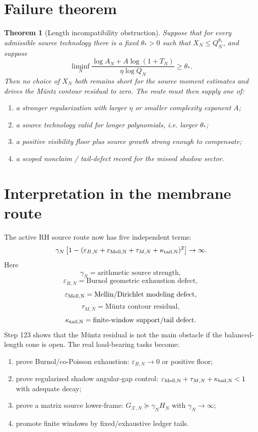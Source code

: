 \documentclass[11pt]{article}
\newtheorem{theorem}{Theorem}
\newcommand{\eps}{\varepsilon}
\newcommand{\cX}{\mathcal X}
\begin{document}
\section{Failure theorem}
\begin{theorem}[Length incompatibility obstruction]
Suppose that for every admissible source technology there is a fixed $\theta_*>0$ such that $X_N\le Q_N^{\theta_*}$, and suppose
\[
\liminf_N
\frac{\log A_N+A\log(1+T_N)}{\eta\log Q_N}
\ge\theta_*.
\]
Then no choice of $X_N$ both remains short for the source moment estimates and drives the M\"untz contour residual to zero.  The route must then supply one of:
\begin{enumerate}[label=(\roman*)]
\item a stronger regularization with larger $\eta$ or smaller complexity exponent $A$;
\item a source technology valid for longer polynomials, i.e. larger $\theta_*$;
\item a positive visibility floor plus source growth strong enough to compensate;
\item a scoped nonclaim / tail-defect record for the missed shadow sector.
\end{enumerate}
\end{theorem}

\section{Interpretation in the membrane route}
The active RH source route now has five independent terms:
\[
\gamma_N
\left[
1-(\eps_{B,N}+\eps_{\rm Mell,N}+\tau_{M,N}+\kappa_{\rm tail,N})^2
\right]
\to\infty.
\]
Here
\[
\gamma_N=\text{arithmetic source strength},
\]
\[
\eps_{B,N}=\text{Burnol geometric exhaustion defect},
\]
\[
\eps_{\rm Mell,N}=\text{Mellin/Dirichlet modeling defect},
\]
\[
\tau_{M,N}=\text{M\"untz contour residual},
\]
\[
\kappa_{\rm tail,N}=\text{finite-window support/tail defect}.
\]
Step 123 shows that the M\"untz residual is not the main obstacle if the balanced-length cone is open.  The real load-bearing tasks become:
\begin{enumerate}[label=O\arabic*.]
\item prove Burnol/co-Poisson exhaustion: $\eps_{B,N}\to0$ or positive floor;
\item prove regularized shadow angular-gap control: $\eps_{\rm Mell,N}+\tau_{M,N}+\kappa_{\rm tail,N}<1$ with adequate decay;
\item prove a matrix source lower-frame: $G_{\cX,N}\succeq\gamma_NH_N$ with $\gamma_N\to\infty$;
\item promote finite windows by fixed/exhaustive ledger tails.
\end{enumerate}
\end{document}
